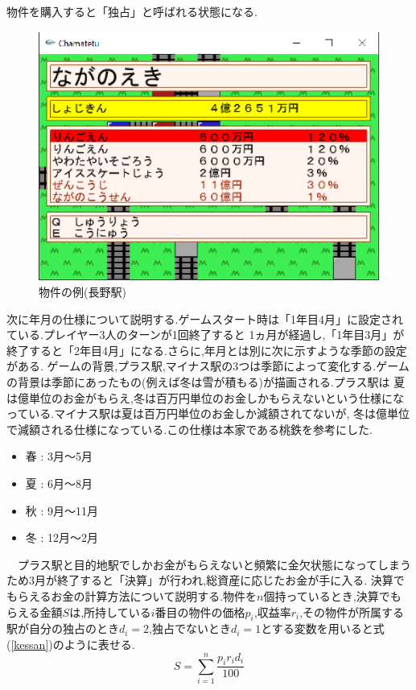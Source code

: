\documentclass[a4j]{jarticle}
\begin{document}
    物件を購入すると「独占」と呼ばれる状態になる.
    \begin{figure}[H]
      \centering
      \includegraphics[scale=1.4]{bukkenex.eps}
      \caption{物件の例(長野駅)}
       \label{bukken_exsample}
      \end{figure}
    
      次に年月の仕様について説明する.ゲームスタート時は「1年目4月」に設定されている.プレイヤー3人のターンが1回終了すると
      1ヵ月が経過し,「1年目3月」が終了すると「2年目4月」になる.さらに,年月とは別に次に示すような季節の設定がある.
      ゲームの背景,プラス駅,マイナス駅の3つは季節によって変化する.ゲームの背景は季節にあったもの(例えば冬は雪が積もる)が描画される.プラス駅は
      夏は億単位のお金がもらえ,冬は百万円単位のお金しかもらえないという仕様になっている.マイナス駅は夏は百万円単位のお金しか減額されてないが,
      冬は億単位で減額される仕様になっている.この仕様は本家である桃鉄を参考にした.
      \begin{itemize}
      \item 春 : 3月～5月 
      \item 夏 : 6月～8月 
      \item 秋 : 9月～11月 
      \item 冬 : 12月～2月 
    \end{itemize}
      　プラス駅と目的地駅でしかお金がもらえないと頻繁に金欠状態になってしまうため3月が終了すると「決算」が行われ,総資産に応じたお金が手に入る.
      決算でもらえるお金の計算方法について説明する.物件を$n$個持っているとき,決算でもらえる金額$S$は,所持している$i$番目の物件の価格$p_i$,収益率$r_i$,その物件が所属する
      駅が自分の独占のとき$d_i=2$,独占でないとき$d_i=1$とする変数を用いると式(\ref{kessan})のように表せる.
      \begin{equation}
        S = \sum_{i=1}^{n} \frac{p_i r_i d_i}{100}
        \label{kessan}
      \end{equation}
\end{document}
